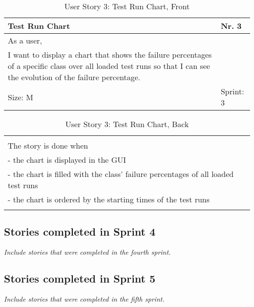 \begin{table}[H]
  \caption{User Story 3: Test Run Chart, Front}
  \label{Story_3_Front}
  \centering
  \begin{tabular}{|p{9cm} p{2cm}|}
	\hline  	
  	Test Run Chart & Nr. 3 \\ 
  	\hline
  	As a user, &    \\ 
  	I want to display a chart that shows the failure percentages of a specific class over all loaded test runs so that I can see the evolution of the failure percentage. &    \\ 
  	Size: M & Sprint: 3 \\ 
  	\hline
  \end{tabular}
\end{table}
\begin{table}[H]
  \caption{User Story 3: Test Run Chart, Back}
  \label{Story_3_Back}
  \centering
  \begin{tabular}{|p{10cm} p{1cm}|}
  \hline
  	  &    \\ 
  	The story is done when &    \\ 
  	 - the chart is displayed in the GUI & \\ 
  	 - the chart is filled with the class' failure percentages of all loaded test runs & \\ 
  	 - the chart is ordered by the starting times of the test runs & \\ 

  	 
  	  &  
  	   \\ 
  	\hline
  \end{tabular}
\end{table}

\subsection*{Stories completed in Sprint 4}
\emph{Include stories that were completed in the fourth sprint.} 

\subsection*{Stories completed in Sprint 5}
\emph{Include stories that were completed in the fifth sprint.}

\ \\ 

